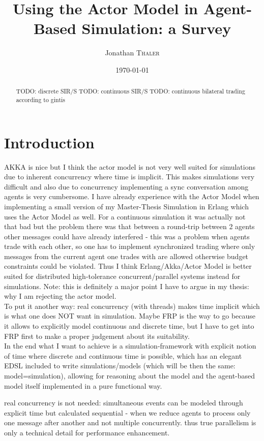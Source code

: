 \documentclass{article}
\title{Using the Actor Model in Agent-Based Simulation: a Survey} %
\author{Jonathan \textsc{Thaler}} %
\date{\today} %
\begin{document}
\maketitle %

\begin{abstract}
TODO: discrete SIR/S
TODO: continuous SIR/S
TODO: continuous bilateral trading according to gintis
\end{abstract}

\section{Introduction}
AKKA is nice but I think the actor model is not very well suited for simulations  due to inherent concurrency where time is implicit. This makes simulations very difficult and also due to concurrency implementing a sync conversation among agents is very cumbersome. I have already experience with the Actor Model when implementing a small version of my Master-Thesis Simulation in Erlang which uses the Actor Model as well. For a continuous simulation it was actually not that bad but the problem there was that between a round-trip between 2 agents other messages could have already interfered - this was a problem when agents trade with each other, so one has to implement synchronized trading where only messages from the current agent one trades with are allowed otherwise budget constraints could be violated. Thus I think Erlang/Akka/Actor Model is better suited for distributed high-tolerance concurrent/parallel systems instead for simulations. Note: this is definitely a major point I have to argue in my thesis: why I am rejecting the actor model.
\\
To put it another way: real concurrency (with threads) makes time implicit which is what one does NOT want in simulation. Maybe FRP is the way to go because it allows to explicitly model continuous and discrete time, but I have to get into FRP first to make a proper judgement about its suitability.
\\
In the end what I want to achieve is a simulation-framework with explicit notion of time where discrete and continuous time is possible, which has an elegant EDSL included to write simulations/models (which will be then the same: model=simulation), allowing for reasoning about the model and the agent-based model itself implemented in a pure functional way.


real concurrency is not needed: simultaneous events can be modeled through explicit time but calculated sequential - when we reduce agents to process only one message after another and not multiple concurrently. thus true parallelism is only a technical detail for performance enhancement.
\end{document}
